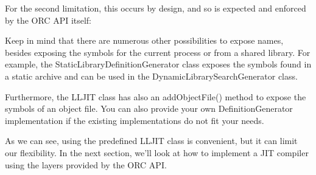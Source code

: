 For the second limitation, this occurs by design, and so is expected and enforced by the ORC API itself:


Keep in mind that there are numerous other possibilities to expose names, besides exposing the symbols for the current process or from a shared library. For example, the StaticLibraryDefinitionGenerator class exposes the symbols found in a static archive and can be used in the DynamicLibrarySearchGenerator class.

Furthermore, the LLJIT class has also an addObjectFile() method to expose the symbols of an object file. You can also provide your own DefinitionGenerator implementation if the existing implementations do not fit your needs.

As we can see, using the predefined LLJIT class is convenient, but it can limit our flexibility. In the next section, we’ll look at how to implement a JIT compiler using the layers provided by the ORC API.

















